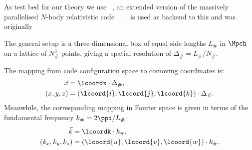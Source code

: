 







As test bed for our theory we use \gwasevolution~\citep{christiansenAsevolutionRelativisticNbody2023}, an extended version of the massively parallelised $N$-body relativistic code \gevolution~\citep{adamekGevolutionCosmologicalNbody2016}. \latfield~\citep{daverioLatfield2LibraryClassical2016} is used as backend to this and was originally \blahblah








The general setup is a three-dimensional box of equal side lengths $L_\#$ in $\Mpch$ on a lattice of $N_\#^3$ points, giving a spatial resolution of $\Delta_\#=L_\#/N_\#$. %

The mapping from code configuration space to comoving coordinates is: %
\begin{equation}
    \begin{split}
        \vec{x} & = \lcoordx \cdot \Delta_\# ,\\
        (x, y, z)&= (\lcoord{i}, \lcoord{j}, \lcoord{k})\cdot \Delta_\#.
    \end{split}
\end{equation}
Meanwhile, the corresponding mapping in Fourier space is given in terms of the fundamental frequency $k_\#=2\ppi/L_\#$: %
\begin{equation}
    \begin{split}
        \vec{k} & = \lcoordk \cdot k_\#,\\
        (k_x, k_y, k_z)&=  (\lcoord{u}, \lcoord{v}, \lcoord{w})\cdot k_\#.
    \end{split}
\end{equation}




